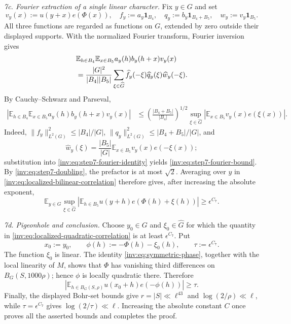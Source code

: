 \documentclass[twoside]{aomart}
\makeatletter
\theoremstyle{paperplain}
\theoremstyle{paperdefinition}
\renewenvironment{proof}[1][\proofname]{\par\pushQED{\qed}%
  \normalfont\topsep6\p@\@plus3\p@\relax\trivlist
  \item[\hskip\labelsep\itshape #1\@addpunct{.}]\ignorespaces
}{\popQED\endtrivlist\@endpefalse}
\numberwithin{equation}{section}
\makeatother
\begin{document}
\begin{proof}
\smallskip
\noindent\emph{7c. Fourier extraction of a single linear character.}
Fix $y\in G$ and set
\[
 v_y(x):=u(y+x)e(\Phi(x)),\quad
 f_y:=a_y\mathbf1_{B_4},\quad
 q_y:=b_y\mathbf1_{B_4+B_5},\quad
 w_y:=v_y\mathbf1_{B_5}.
\]
All three functions are regarded as functions on $G$, extended by zero
outside their displayed supports. With the normalized Fourier transform,
Fourier inversion gives
\begin{align}
 &\mathbb E_{h\in B_4}\mathbb E_{x\in B_5}
       a_y(h)b_y(h+x)v_y(x) \notag\\
 &=\frac{|G|^2}{|B_4||B_5|}
   \sum_{\xi\in\widehat G}
      \widehat f_y(-\xi)\widehat q_y(\xi)\widehat w_y(-\xi).
 \label{inv:eq:step7-fourier-identity}
\end{align}
By Cauchy--Schwarz and Parseval,
\begin{align}
 \left|\mathbb E_{h\in B_4}\mathbb E_{x\in B_5}
       a_y(h)b_y(h+x)v_y(x)\right|
 &\le
 \left(\frac{|B_4+B_5|}{|B_4|}\right)^{1/2}
 \sup_{\xi\in\widehat G}
 \left|\mathbb E_{x\in B_5}v_y(x)e(\xi(x))\right|.
 \label{inv:eq:step7-fourier-bound}
\end{align}
Indeed,
$\|f_y\|_{L^2(G)}^2\le|B_4|/|G|$,
$\|q_y\|_{L^2(G)}^2\le|B_4+B_5|/|G|$, and
\[
 \widehat w_y(\xi)=\frac{|B_5|}{|G|}
       \mathbb E_{x\in B_5}v_y(x)e(-\xi(x));
\]
substitution into \eqref{inv:eq:step7-fourier-identity} yields
\eqref{inv:eq:step7-fourier-bound}. By
\eqref{inv:eq:step7-doubling}, the prefactor is at most $\sqrt2$.
Averaging over $y$ in
\eqref{inv:eq:localized-bilinear-correlation} therefore gives, after
increasing the absolute exponent,
\begin{equation}
 \mathbb E_{y\in G}\sup_{\xi\in\widehat G}
 \left|\mathbb E_{h\in B_5}u(y+h)
 e\!\left(\Phi(h)+\xi(h)\right)\right|
 \ge\epsilon^{C_7}.
 \label{inv:eq:localized-quadratic-correlation}
\end{equation}

\smallskip
\noindent\emph{7d. Pigeonhole and conclusion.}
Choose $y_0\in G$ and $\xi_0\in\widehat G$ for which the quantity in
\eqref{inv:eq:localized-quadratic-correlation} is at least
$\epsilon^{C_7}$. Put
\[
 x_0:=y_0,\qquad
 \phi(h):=-\Phi(h)-\xi_0(h),\qquad
 \tau:=\epsilon^{C_7}.
\]
The function $\xi_0$ is linear. The identity
\eqref{inv:eq:symmetric-phase}, together with the local linearity of $M$,
shows that $\Phi$ has vanishing third differences on
$B_G(S,1000\rho)$; hence $\phi$ is locally quadratic there. Therefore
\[
 \left|\mathbb E_{h\in B_G(S,\rho)}
       u(x_0+h)e(-\phi(h))\right|\ge\tau.
\]
Finally, the displayed Bohr-set bounds give
$r=|S|\ll\ell^{43}$ and
$\log(2/\rho)\ll\ell$, while
$\tau=\epsilon^{C_7}$ gives $\log(2/\tau)\ll\ell$.
Increasing the absolute constant $C$ once proves all the asserted
bounds and completes the proof.
\end{proof}
\end{document}
